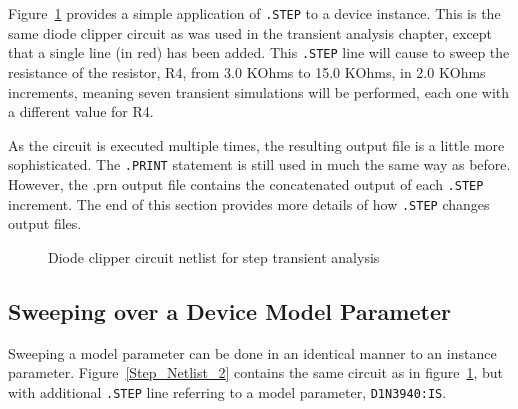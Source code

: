 Figure~\ref{Step_Netlist_1} provides a simple application of
\verb|.STEP| to a device instance.  This is the same diode clipper
circuit as was used in the transient analysis chapter, except that a
single line (in red) has been added.  This \verb|.STEP| line will
cause \Xyce{} to sweep the resistance of the resistor, R4, from 3.0
KOhms to 15.0 KOhms, in 2.0 KOhms increments, meaning seven transient
simulations will be performed, each one with a different value for R4.

As the circuit is executed multiple times, the resulting output file
is a little more sophisticated.  The \verb|.PRINT| statement is still
used in much the same way as before.  However, the .prn output file
contains the concatenated output of each \verb|.STEP| increment.  The
end of this section provides more details of how \texttt{.STEP}
changes output files.

\begin{figure}[htbp]
\begin{centering}
\caption{Diode clipper circuit netlist for step transient
analysis\label{Step_Netlist_1}}
\end{centering}
\end{figure}

\subsection{Sweeping over a Device Model Parameter}
\label{step_ModelParam}

Sweeping a model parameter can be done in an identical manner to an
instance parameter.  Figure~\ref{Step_Netlist_2} contains the same
circuit as in figure~\ref{Step_Netlist_1}, but with additional
\verb|.STEP| line referring to a model parameter, \verb|D1N3940:IS|.

